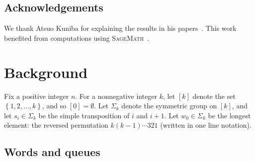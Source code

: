 \documentclass[reqno]{amsart}
\newcommand{\0}{\phantom{c}}
\newcommand{\SymGp}[1]{\Sigma_{#1}} %
\newcommand{\set}[1]{\left\{ #1 \right\}}
\newcommand{\ive}[1]{\left[ #1 \right]}
\theoremstyle{plain}
\theoremstyle{definition}
\numberwithin{equation}{section}
\newcommand{\Erik}[1]{\todo[size=\tiny,inline,color=green!30]{#1
      \\ \hfill --- Erik}}
\newcommand{\darij}[1]{\todo[size=\tiny,color=red!30]{#1 \\ \hfill --- Darij}}
\begin{document}
%


\subsection{Acknowledgements}

We thank Atsuo Kuniba for explaining the results in his papers~\cite{KMO15,KMO16II,KMO16,KMO16TARZP,KMO16TARZPII}.
This work benefited from computations using \textsc{SageMath}~\cite{sage,combinat}.









\section{Background}
\label{sec:background}

Fix a positive integer $n$.
For a nonnegative integer $k$, let $\ive{k}$ denote the set $\set{1, 2, \ldots, k}$, and so $[0] = \emptyset$.
Let $\SymGp{k}$ denote the symmetric group on $\ive{k}$, and let $s_i \in \SymGp{k}$ be the simple transposition of $i$ and $i+1$.
Let $w_0 \in \SymGp{k}$ be the longest element: the reversed permutation $k (k-1) \dotsm 321$ (written in one line notation).

\subsection{Words and queues}
\end{document}
